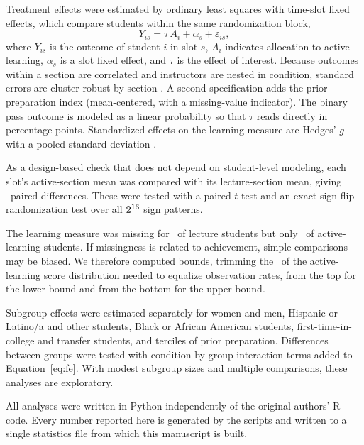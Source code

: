 \documentclass[10pt,twocolumn,letterpaper]{article}
\begin{document}
Treatment effects were estimated by ordinary least squares with time-slot fixed effects, which compare students within the same randomization block,
\begin{equation}
Y_{is} = \tau\,A_{i} + \alpha_{s} + \varepsilon_{is},
\label{eq:fe}
\end{equation}
where $Y_{is}$ is the outcome of student $i$ in slot $s$, $A_i$ indicates allocation to active learning, $\alpha_s$ is a slot fixed effect, and $\tau$ is the effect of interest. Because outcomes within a section are correlated and instructors are nested in condition, standard errors are cluster-robust by section \citep[CR1; \Nclusters\ clusters; $t$ reference with \Ndf\ degrees of freedom;][]{cameron2015}. A second specification adds the prior-preparation index (mean-centered, with a missing-value indicator). The binary pass outcome is modeled as a linear probability so that $\tau$ reads directly in percentage points. Standardized effects on the learning measure are Hedges' $g$ with a pooled standard deviation \citep{hedges1981}.

As a design-based check that does not depend on student-level modeling, each slot's active-section mean was compared with its lecture-section mean, giving \PairsN\ paired differences. These were tested with a paired $t$-test and an exact sign-flip randomization test over all $2^{16}$ sign patterns.

The learning measure was missing for \MissLec\ of lecture students but only \MissAct\ of active-learning students. If missingness is related to achievement, simple comparisons may be biased. We therefore computed \citet{lee2009} bounds, trimming the \LeeTrim\ of the active-learning score distribution needed to equalize observation rates, from the top for the lower bound and from the bottom for the upper bound.

Subgroup effects were estimated separately for women and men, Hispanic or Latino/a and other students, Black or African American students, first-time-in-college and transfer students, and terciles of prior preparation. Differences between groups were tested with condition-by-group interaction terms added to Equation~\ref{eq:fe}. With modest subgroup sizes and multiple comparisons, these analyses are exploratory.

All analyses were written in Python independently of the original authors' R code. Every number reported here is generated by the scripts and written to a single statistics file from which this manuscript is built.
\end{document}
